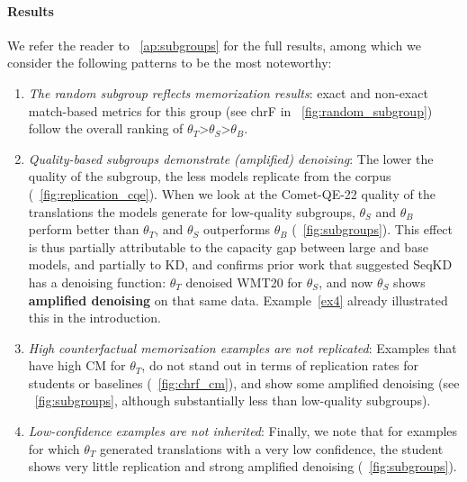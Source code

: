 \paragraph{Results}
We refer the reader to \appendixshortcut~\ref{ap:subgroups} for the full results, among which we consider the following patterns to be the most noteworthy:
\begin{enumerate}
\item \textit{The random subgroup reflects memorization results}: exact and non-exact match-based metrics for this group (see chrF in \figureshortcut~\ref{fig:random_subgroup}) follow the overall ranking of $\theta_T$>$\theta_S$>$\theta_B$.
\item \textit{Quality-based subgroups demonstrate (amplified) denoising}: The lower the quality of the subgroup, the less models replicate from the corpus (\figureshortcut~\ref{fig:replication_cqe}). When we look at the Comet-QE-22 quality of the translations the models generate for low-quality subgroups, $\theta_S$ and $\theta_B$ perform better than $\theta_T$, and $\theta_S$ outperforms $\theta_B$ (\figureshortcut~\ref{fig:subgroups}). This effect is thus partially attributable to the capacity gap between large and base models, and partially to KD, and confirms prior work \citep[e.g.,][]{zhouunderstanding} that suggested SeqKD has a denoising function: $\theta_T$ denoised WMT20 for $\theta_S$, and now $\theta_S$ shows \textbf{amplified denoising} on that same data. Example~\ref{ex4} already illustrated this in the introduction.
\item \textit{High counterfactual memorization examples are not replicated}: Examples that have high CM for $\theta_T$, do not stand out in terms of replication rates for students or baselines (\figureshortcut~\ref{fig:chrf_cm}), and show some amplified denoising (see \figureshortcut~\ref{fig:subgroups}, although substantially less than low-quality subgroups). 
\item \textit{Low-confidence examples are not inherited}: Finally, we note that for examples for which $\theta_T$ generated translations with a very low confidence, the student shows very little replication and strong amplified denoising (\figureshortcut~\ref{fig:subgroups}).
\end{enumerate}

